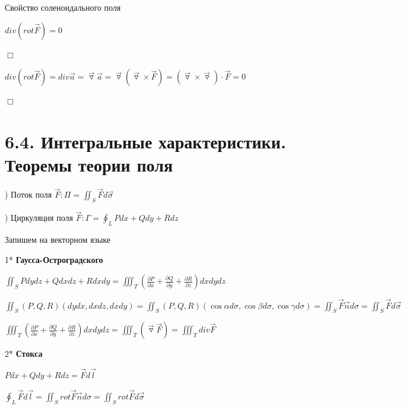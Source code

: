 \documentclass[12pt]{article}
\begin{document}
     Свойство соленоидального поля

    $div (rot \overrightarrow{F}) = 0$

    $\Box$

    $div (rot \overrightarrow{F}) = div \overrightarrow{a} = \overrightarrow{\triangledown} \overrightarrow{a} = \overrightarrow{\triangledown} (\overrightarrow{\triangledown} \times \overrightarrow{F}) = (\overrightarrow{\triangledown} \times \overrightarrow{\triangledown}) \cdot \overrightarrow{F} = 0$

    $\Box$

    \section{6.4. Интегральные характеристики. Теоремы теории поля}

    ) Поток поля $\overrightarrow{F}: \Pi = \iint_S \overrightarrow{F}d\overrightarrow{\sigma}$

    ) Циркуляция поля $\overrightarrow{F}: \Gamma = \oint_L Pdx + Qdy + Rdz$

    \Nota Запишем \Ths на векторном языке

    1* \hypertarget{gaussostrogradskyyvector}{\textbf{Гаусса-Остроградского}}

    $\iint_S Pdydz + Qdxdz + Rdxdy = \iiint_T \left(\frac{\partial P}{\partial x} + \frac{\partial Q}{\partial y} + \frac{\partial R}{\partial z}\right) dxdydz$

    $\iint_S (P, Q, R) (dydx, dxdz, dxdy) = \iint_S (P, Q, R) (\cos\alpha d\sigma, \cos\beta d\sigma, \cos\gamma d\sigma) =
    \iint_S \overrightarrow{F} \overrightarrow{n} d\sigma = \iint_S \overrightarrow{F} d\overrightarrow{\sigma}$

    $\iiint_T \left(\frac{\partial P}{\partial x} + \frac{\partial Q}{\partial y} + \frac{\partial R}{\partial z}\right) dxdydz = \iiint_T (\overrightarrow{\triangledown} \overrightarrow{F}) = \iiint_T div \overrightarrow{F}$


    \mediumvspace

    2* \hypertarget{stoksvector}{\textbf{Стокса}}

    $Pdx + Qdy + Rdz = \overrightarrow{F}d\overrightarrow{l}$

    $\oint_L \overrightarrow{F}d\overrightarrow{l} = \iint_S rot \overrightarrow{F} \overrightarrow{n} d\sigma = \iint_S rot \overrightarrow{F} d\overrightarrow{\sigma}$
\end{document}

